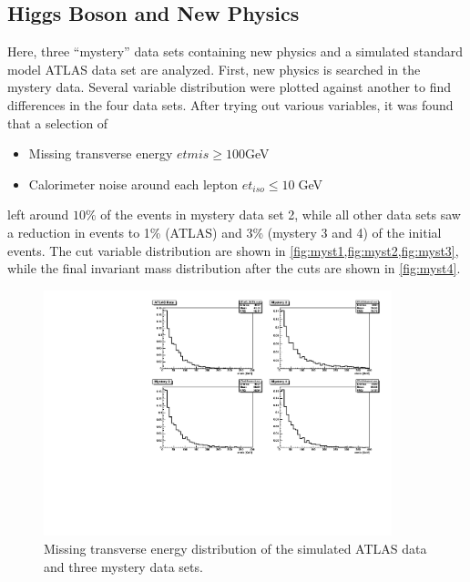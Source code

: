 \documentclass[twoside,        %
               BCOR12mm,       %
               ngerman,english, %
               fleqn,headsepline=false,footsepline=false
              ]{Vorlage/MFPREPORT}
\begin{document}
\subsection{Higgs Boson and New Physics}
Here, three ``mystery'' data sets containing new physics and a simulated
standard model ATLAS data set are analyzed.
First, new physics is searched in the mystery data. Several variable
distribution were plotted against another to find differences in the four data
sets. After trying out various variables, it was found that a selection of
\begin{itemize}
    \item Missing transverse energy $etmis\geq100$\;GeV
    \item Calorimeter noise around each lepton $et_{iso}\leq10\;$GeV
\end{itemize}
left around $10\%$ of the events in mystery data set 2, while all other data
sets saw a reduction in events to 1\% (ATLAS) and 3\% (mystery 3 and 4) of the
initial events. The cut variable distribution are shown in
\cref{fig:myst1,fig:myst2,fig:myst3}, while the final invariant mass distribution after
the cuts are shown in \cref{fig:myst4}.
\begin{figure}[h!]
    \begin{center}
        \includegraphics[width=0.9\textwidth]{ZZ/mystery_met_uncut.pdf}
    \end{center}
    \caption{Missing transverse energy distribution of the simulated ATLAS data and three mystery data sets.}
    \label{fig:myst1}
\end{figure}
\end{document}
